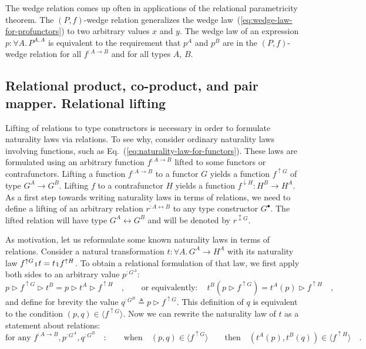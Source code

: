 The wedge relation comes up often in applications of the relational
parametricity theorem. The $\left(P,f\right)$-wedge relation generalizes
the wedge law~(\ref{eq:wedge-law-for-profunctors}) to two arbitrary
values $x$ and $y$. The wedge law of an expression $p:\forall A.\,P^{A,A}$
is equivalent to the requirement that $p^{A}$ and $p^{B}$ are in
the $\left(P,f\right)$-wedge relation for all $f^{:A\rightarrow B}$
and for all types $A$, $B$. 

\subsection{Relational product, co-product, and pair mapper. Relational lifting}

Lifting of relations to type constructors is necessary in order to
formulate naturality laws via relations. To see why, consider ordinary
naturality laws involving functions, such as Eq.~(\ref{eq:naturality-law-for-functors}).
These laws are formulated using an arbitrary function $f^{:A\rightarrow B}$
lifted to some functors or contrafunctors. Lifting a function $f^{:A\rightarrow B}$
to a functor $G$ yields a function $f^{\uparrow G}$ of type $G^{A}\rightarrow G^{B}$.
Lifting $f$ to a contrafunctor $H$ yields a function $f^{\downarrow H}:H^{B}\rightarrow H^{A}$.
As a first step towards writing naturality laws in terms of relations,
we need to define a lifting of an arbitrary relation $r^{:A\leftrightarrow B}$
to any type constructor $G^{\bullet}$. The lifted relation will have
type $G^{A}\leftrightarrow G^{B}$ and will be denoted by $r^{\updownarrow G}$.

As motivation, let us reformulate some known naturality laws in terms
of relations. Consider a natural transformation $t:\forall A.\,G^{A}\rightarrow H^{A}$
with its naturality law $f^{\uparrow G}\bef t=t\bef f^{\uparrow H}$.
To obtain a relational formulation of that law, we first apply both
sides to an arbitrary value $p^{:G^{A}}$:
\[
p\triangleright f^{\uparrow G}\triangleright t^{B}=p\triangleright t^{A}\triangleright f^{\uparrow H}\quad,\quad\quad\text{or equivalently}:\quad t^{B}(p\triangleright f^{\uparrow G})=t^{A}(p)\triangleright f^{\uparrow H}\quad,
\]
and define for brevity the value $q^{:G^{B}}\triangleq p\triangleright f^{\uparrow G}$.
This definition of $q$ is equivalent to the condition $(p,q)\in\langle f^{\uparrow G}\rangle$.
Now we can rewrite the naturality law of $t$ as a statement about
relations: 
\begin{equation}
\text{for any }f^{:A\rightarrow B},p^{:G^{A}},q^{:G^{B}}\quad:\quad\quad\text{when}\quad(p,q)\in\langle f^{\uparrow G}\rangle\quad\quad\text{then}\quad(t^{A}(p),t^{B}(q))\in\langle f^{\uparrow H}\rangle\quad.\label{eq:naturality-law-of-t-derivation1}
\end{equation}

